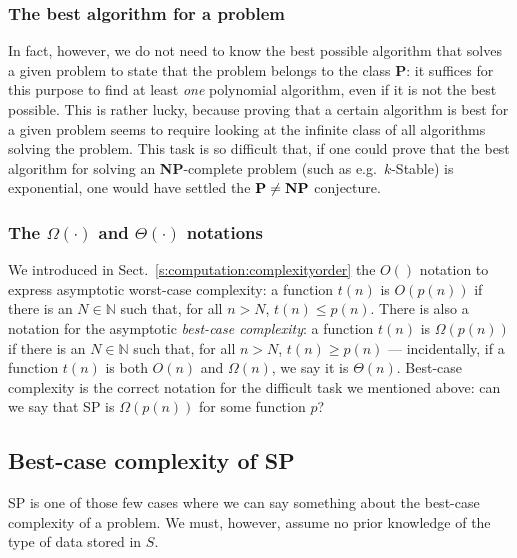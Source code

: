 \documentclass[a4paper]{book}
\theoremstyle{changebreak}                %
\begin{document}
\subsubsection{The best algorithm for a problem}
In fact, however, we do not need to know the best possible algorithm
that solves a given problem to state that the problem belongs to the
class {\bf P}: it suffices for this purpose to find at least {\it one}
polynomial algorithm, even if it is not
the best possible. This is rather lucky, because proving that a
certain algorithm is best for a given problem seems to require looking
at the infinite class of all algorithms solving
the problem. This task is so difficult that, if one could prove that
the best algorithm for solving an {\bf
  NP}-complete problem
(such as e.g.~{\sc $k$-Stable}) is
exponential, one would have settled the $\mbox{\bf P}\not=\mbox{\bf
  NP}$ conjecture.

\subsubsection{The $\Omega(\cdot)$ and $\Theta(\cdot)$ notations}
We introduced in Sect.~\ref{s:computation:complexityorder} the
$O()$ notation to express asymptotic worst-case
complexity:
a function $t(n)$ is $O(p(n))$ if there is an $N\in\mathbb{N}$ such
that, for all $n>N$, $t(n)\le p(n)$. There is also a notation for the
asymptotic {\it best-case complexity}: a
function $t(n)$ is $\Omega(p(n))$\index{$\Omega(\cdot)$} if there is
an $N\in\mathbb{N}$ such that, for all $n>N$, $t(n)\ge p(n)$ ---
incidentally, if a function $t(n)$ is both $O(n)$ and $\Omega(n)$, we
say it is $\Theta(n)$.\index{$\Theta(\cdot)$} Best-case complexity is
the correct notation for the difficult task we mentioned above: can we
say that SP is $\Omega(p(n))$ for some function $p$?

\subsection{Best-case complexity of SP}
SP is one of those few cases where we can say something about the
best-case complexity of a problem. We must, however, assume no prior
knowledge of the type of data stored in $S$.
\end{document}
